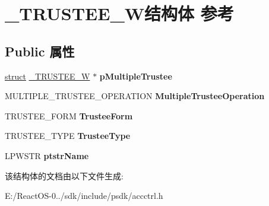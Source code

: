\hypertarget{struct___t_r_u_s_t_e_e___w}{}\section{\+\_\+\+T\+R\+U\+S\+T\+E\+E\+\_\+\+W结构体 参考}
\label{struct___t_r_u_s_t_e_e___w}
\subsection*{Public 属性}
\begin{DoxyCompactItemize}
\item 
\mbox{\label{struct___t_r_u_s_t_e_e___w_a7eda19399250ef49eb08613172ab7b4f}} 
\hyperlink{interfacestruct}{struct} \hyperlink{struct___t_r_u_s_t_e_e___w}{\+\_\+\+T\+R\+U\+S\+T\+E\+E\+\_\+W} $\ast$ {\bfseries p\+Multiple\+Trustee}
\item 
\mbox{\label{struct___t_r_u_s_t_e_e___w_aee78d00e0733a7f6a85d502bdf0e6cbe}} 
M\+U\+L\+T\+I\+P\+L\+E\+\_\+\+T\+R\+U\+S\+T\+E\+E\+\_\+\+O\+P\+E\+R\+A\+T\+I\+ON {\bfseries Multiple\+Trustee\+Operation}
\item 
\mbox{\label{struct___t_r_u_s_t_e_e___w_a8b7ade3dbebded03e0fcb85de862620e}} 
T\+R\+U\+S\+T\+E\+E\+\_\+\+F\+O\+RM {\bfseries Trustee\+Form}
\item 
\mbox{\label{struct___t_r_u_s_t_e_e___w_a87efacd50dee59090733290b81adcdc3}} 
T\+R\+U\+S\+T\+E\+E\+\_\+\+T\+Y\+PE {\bfseries Trustee\+Type}
\item 
\mbox{\label{struct___t_r_u_s_t_e_e___w_a08167b8aa8ed8ed0edc314a6d239db7c}} 
L\+P\+W\+S\+TR {\bfseries ptstr\+Name}
\end{DoxyCompactItemize}


该结构体的文档由以下文件生成\+:\begin{DoxyCompactItemize}
\item 
E\+:/\+React\+O\+S-\/0../sdk/include/psdk/accctrl.\+h\end{DoxyCompactItemize}
